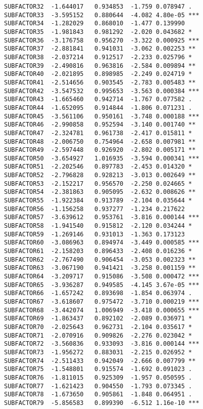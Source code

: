 \documentclass[]{book}
\begin{document}
\begin{verbatim}
SUBFACTOR32  -1.644017   0.934853  -1.759 0.078947 .  
SUBFACTOR33  -3.595152   0.880644  -4.082 4.80e-05 ***
SUBFACTOR34  -1.282029   0.868010  -1.477 0.139990    
SUBFACTOR35  -1.981843   0.981292  -2.020 0.043682 *  
SUBFACTOR36  -3.176758   0.956270  -3.322 0.000925 ***
SUBFACTOR37  -2.881841   0.941031  -3.062 0.002253 ** 
SUBFACTOR38  -2.037214   0.912517  -2.233 0.025796 *  
SUBFACTOR39  -2.490816   0.963816  -2.584 0.009894 ** 
SUBFACTOR40  -2.021895   0.898985  -2.249 0.024719 *  
SUBFACTOR41  -2.514656   0.903545  -2.783 0.005483 ** 
SUBFACTOR42  -3.547532   0.995653  -3.563 0.000384 ***
SUBFACTOR43  -1.665460   0.942714  -1.767 0.077582 .  
SUBFACTOR44  -1.652095   0.914844  -1.806 0.071231 .  
SUBFACTOR45  -3.561106   0.950161  -3.748 0.000188 ***
SUBFACTOR46  -2.990858   0.952594  -3.140 0.001740 ** 
SUBFACTOR47  -2.324781   0.961738  -2.417 0.015811 *  
SUBFACTOR48  -2.006750   0.754964  -2.658 0.007981 ** 
SUBFACTOR49  -2.597448   0.926920  -2.802 0.005171 ** 
SUBFACTOR50  -3.654927   1.016935  -3.594 0.000341 ***
SUBFACTOR51  -2.202546   0.897783  -2.453 0.014320 *  
SUBFACTOR52  -2.796828   0.928213  -3.013 0.002649 ** 
SUBFACTOR53  -2.152217   0.956570  -2.250 0.024665 *  
SUBFACTOR54  -2.381863   0.905095  -2.632 0.008626 ** 
SUBFACTOR55  -1.922384   0.913789  -2.104 0.035644 *  
SUBFACTOR56  -1.156258   0.937277  -1.234 0.217622    
SUBFACTOR57  -3.639612   0.953761  -3.816 0.000144 ***
SUBFACTOR58  -1.941540   0.915812  -2.120 0.034244 *  
SUBFACTOR59  -1.269146   0.931013  -1.363 0.173123    
SUBFACTOR60  -3.086963   0.894974  -3.449 0.000585 ***
SUBFACTOR61  -2.158203   0.896433  -2.408 0.016236 *  
SUBFACTOR62  -2.767490   0.906454  -3.053 0.002323 ** 
SUBFACTOR63  -3.067190   0.941421  -3.258 0.001159 ** 
SUBFACTOR64  -3.209717   0.915086  -3.508 0.000472 ***
SUBFACTOR65  -3.936287   0.949585  -4.145 3.67e-05 ***
SUBFACTOR66  -1.657242   0.893698  -1.854 0.063974 .  
SUBFACTOR67  -3.618607   0.975472  -3.710 0.000219 ***
SUBFACTOR68  -3.442074   1.006949  -3.418 0.000655 ***
SUBFACTOR69  -1.863437   0.892102  -2.089 0.036971 *  
SUBFACTOR70  -2.025643   0.962731  -2.104 0.035617 *  
SUBFACTOR71  -2.070916   0.909826  -2.276 0.023042 *  
SUBFACTOR72  -3.560836   0.933093  -3.816 0.000144 ***
SUBFACTOR73  -1.956272   0.883031  -2.215 0.026952 *  
SUBFACTOR74  -2.511433   0.942049  -2.666 0.007799 ** 
SUBFACTOR75  -1.548801   0.915574  -1.692 0.091023 .  
SUBFACTOR76  -1.811015   0.925309  -1.957 0.050595 .  
SUBFACTOR77  -1.621423   0.904550  -1.793 0.073345 .  
SUBFACTOR78  -1.673650   0.905861  -1.848 0.064951 .  
SUBFACTOR79  -5.856583   0.899390  -6.512 1.16e-10 ***

\end{verbatim}
\end{document}
